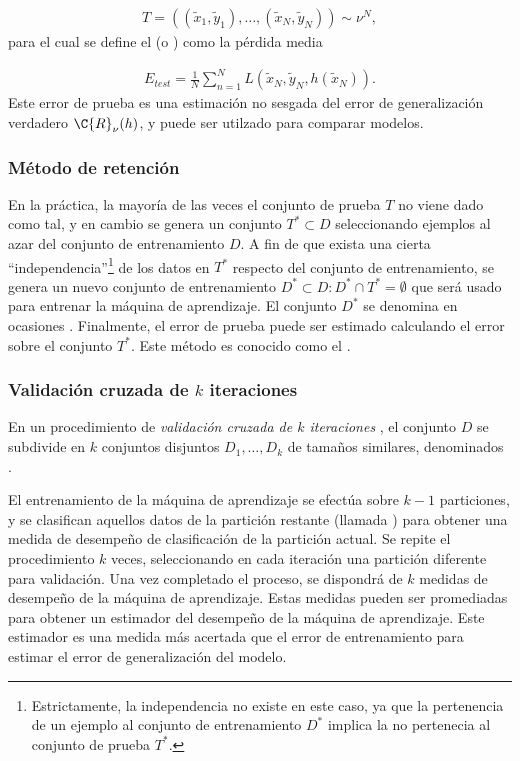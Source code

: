 \begin{align}
  T=((\tilde{x}_1,\tilde{y}_1),\ldots,(\tilde{x}_N,\tilde{y}_N))\sim\nu^N,
  \label{eq:conj-prueba}
\end{align}
para el cual se define el  (o ) como la
pérdida media

\begin{align}
  E_{test}=\frac{1}{N}\sum_{n=1}^N
  L(\tilde{x}_N,\tilde{y}_N,h(\tilde{x}_N)).
  \label{eq:error-prueba}
\end{align}
Este error de prueba es una estimación no sesgada del error de
generalización verdadero $\C{R}_\nu(h)$, y puede ser utilzado para
comparar modelos.

\subsubsection{Método de retención}
\label{retención}

En la práctica, la mayoría de las veces el conjunto de prueba $T$ no
viene dado como tal, y en cambio se genera un conjunto $T^*\subset{}D$
seleccionando ejemplos al azar del conjunto de entrenamiento $D$.  A
fin de que exista una cierta ``independencia''\footnote{Estrictamente,
  la independencia no existe en este caso, ya que la pertenencia de un
  ejemplo al conjunto de entrenamiento $D^*$ implica la no pertenecia
  al conjunto de prueba $T^*$.} de los datos en $T^*$ respecto del
conjunto de entrenamiento, se genera un nuevo conjunto de entrenamiento
$D^*\subset{}D:D^*\cap{}T^*=\emptyset$ que será usado para entrenar la
máquina de aprendizaje. El conjunto $D^*$ se denomina en ocasiones
.
Finalmente, el error de prueba puede ser estimado calculando el error
sobre el conjunto $T^*$. Este método es conocido como el .

\subsubsection{Validación cruzada de $k$ iteraciones}
En un procedimiento de \emph{validación cruzada de $k$ iteraciones}
\cite{crossval}, el conjunto $D$ se subdivide en $k$ conjuntos
disjuntos $D_1,\ldots,D_k$ de tamaños similares, denominados .

El entrenamiento de la máquina de aprendizaje se efectúa sobre $k-1$
particiones, y se clasifican aquellos datos de la partición restante
(llamada ) para obtener una medida de desempeño de
clasificación de la partición actual. Se repite el procedimiento $k$
veces, seleccionando en cada iteración una partición diferente para
validación.  Una vez completado el proceso, se dispondrá de $k$
medidas de desempeño de la máquina de aprendizaje. Estas medidas
pueden ser promediadas para obtener un estimador del desempeño de la
máquina de aprendizaje. Este estimador es una medida más acertada que
el error de entrenamiento para estimar el error de generalización del
modelo.

